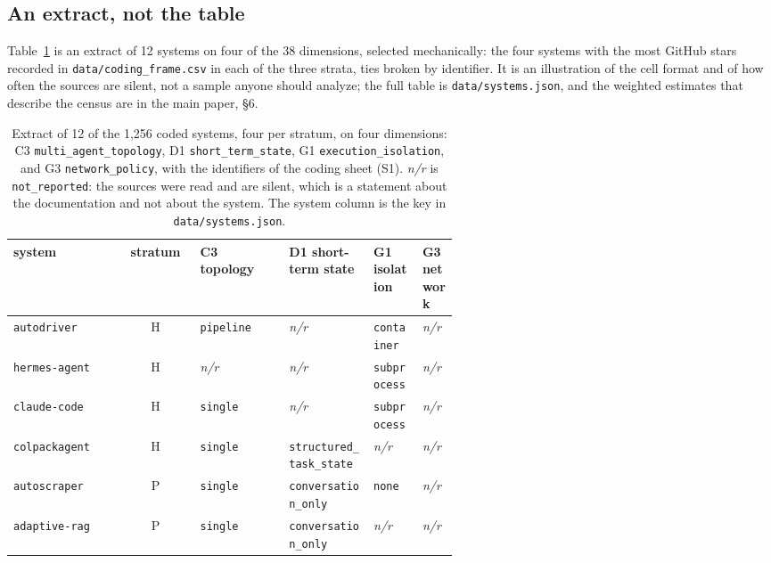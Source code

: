 \subsection{An extract, not the table}
\label{subsec:release-extract}

Table~\ref{tab:systems-extract} is an extract of 12 systems on four of the 38
dimensions, selected mechanically: the four systems with the most GitHub stars recorded in
\texttt{data/coding\_frame.csv} in each of the three strata, ties broken by identifier. It is an
illustration of the cell format and of how often the sources are silent, not a sample anyone should
analyze; the full table is \texttt{data/systems.json}, and the weighted estimates that describe the
census are in the main paper, \S6.

\begin{table}[htbp]
\caption{Extract of 12 of the 1,256 coded systems, four per stratum, on four
dimensions: C3 \texttt{multi\_agent\_topology}, D1 \texttt{short\_term\_state}, G1
\texttt{execution\_isolation}, and G3 \texttt{network\_policy}, with the identifiers of
the coding sheet (S1). \emph{n/r} is \texttt{not\_reported}: the sources were read and are
silent, which is a statement about the documentation and not about the system. The system column is
the key in \texttt{data/systems.json}.}
\label{tab:systems-extract}
\footnotesize
\begin{tabular}{@{}l c p{0.20\linewidth} p{0.19\linewidth} p{0.11\linewidth} p{0.08\linewidth}@{}}
\toprule
system & stratum & C3 topology & D1 short-term state & G1 isolation & G3 network \tabularnewline
\midrule
\texttt{autodriver} & H & \raggedright \texttt{pipeline} & \raggedright \emph{n/r} & \raggedright \texttt{container} & \raggedright \emph{n/r} \tabularnewline
\texttt{hermes-agent} & H & \raggedright \emph{n/r} & \raggedright \emph{n/r} & \raggedright \texttt{subprocess} & \raggedright \emph{n/r} \tabularnewline
\texttt{claude-code} & H & \raggedright \texttt{single} & \raggedright \emph{n/r} & \raggedright \texttt{subprocess} & \raggedright \emph{n/r} \tabularnewline
\texttt{colpackagent} & H & \raggedright \texttt{single} & \raggedright \texttt{structured\_task\_state} & \raggedright \emph{n/r} & \raggedright \emph{n/r} \tabularnewline
\texttt{autoscraper} & P & \raggedright \texttt{single} & \raggedright \texttt{conversation\_only} & \raggedright \texttt{none} & \raggedright \emph{n/r} \tabularnewline
\texttt{adaptive-rag} & P & \raggedright \texttt{single} & \raggedright \texttt{conversation\_only} & \raggedright \emph{n/r} & \raggedright \emph{n/r} \tabularnewline

\end{tabular}
\end{table}
